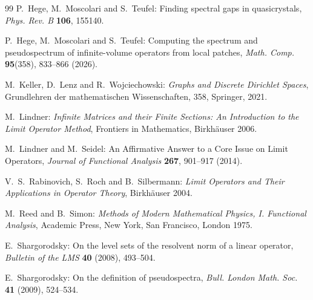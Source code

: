 \documentclass{article}
\newcommand\eps{{\varepsilon}}
\numberwithin{equation}{section}   %
\numberwithin{figure}{section}  %
\begin{document}
\begin{thebibliography}{99}
{\sc P.~Hege, M.~Moscolari} and {\sc S.~Teufel}:
Finding spectral gaps in quasicrystals,
{\it Phys. Rev. B} {\bf 106}, 155140.

{\sc P.~Hege, M.~Moscolari} and {\sc S.~Teufel}:
Computing the spectrum and pseudospectrum of infinite-volume operators from local patches,
{\it Math. Comp.} {\bf 95}(358), 833--866 (2026).

%

{\sc M.~Keller, D.~Lenz} and {\sc R.~Wojciechowski}:
{\it Graphs and Discrete Dirichlet Spaces},
Grundlehren der mathematischen Wissenschaften, 358, Springer, 2021.

{\sc M.~Lindner}:
{\it Infinite Matrices and their Finite Sections: An Introduction to the Limit Operator Method},
Frontiers in Mathematics, Birkh\"auser 2006.

{\sc M.~Lindner} and {\sc M.~Seidel}:
An Affirmative Answer to a Core Issue on Limit Operators,
{\it Journal of Functional Analysis} {\bf 267}, 901--917 (2014).

{\sc V.~S.~Rabinovich, S.~Roch} and {\sc B.~Silbermann}:
{\it Limit Operators and Their Applications in Operator Theory},
Birkh\"auser 2004.

{\sc M.~Reed} and {\sc B.~Simon:} {\it Methods of Modern
Mathematical Physics, I. Functional Analysis},
Academic Press, New York, San Francisco, London 1975.



%
{\sc E.~Shargorodsky}:
On the level sets of the resolvent norm of a linear operator,
{\it Bulletin of the LMS} {\bf 40} (2008), 493--504.

{\sc E.~Shargorodsky:}
On the definition of pseudospectra,
{\it Bull. London Math. Soc.} {\bf 41} (2009), 524--534.
%



\end{thebibliography}
\end{document}
